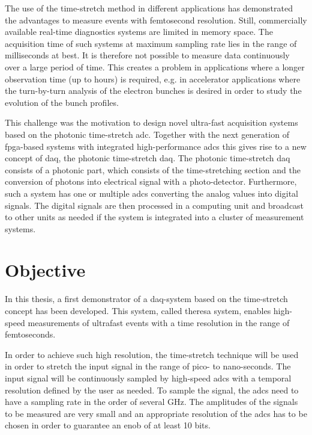 The use of the time-stretch method in different applications has demonstrated the advantages to measure events with femtosecond resolution.
Still, commercially available real-time diagnostics systems are limited in memory space. %
The acquisition time of such systems at maximum sampling rate lies in the range of milliseconds at best.
It is therefore not possible to measure data continuously over a large period of time. 
This creates a problem in applications where a longer observation time (up to hours) is required, e.g. in accelerator applications where the turn-by-turn analysis of the electron bunches is desired in order to study the evolution of the bunch profiles. %

This challenge was the motivation to design novel ultra-fast acquisition systems based on the photonic time-stretch \gls{adc}. 
Together with the next generation of \gls{fpga}-based systems with integrated high-performance \glspl{adc} this gives rise to a new concept of \gls{daq}, the photonic time-stretch \gls{daq}.
The photonic time-stretch \gls{daq} consists of a photonic part, which consists of the time-stretching section and the conversion of photons into electrical signal with a photo-detector. 
Furthermore, such a system has one or multiple \glspl{adc} converting the analog values into digital signals.
The digital signals are then processed in a computing unit and broadcast to other units as needed if the system is integrated into a cluster of measurement systems. %
 

\section{Objective}
In this thesis, a first demonstrator of a \gls{daq}-system based on the time-stretch concept has been developed. %
This system, called \gls{theresa} system, enables high-speed measurements of ultrafast events with a time resolution in the range of femtoseconds.

In order to achieve such high resolution, the time-stretch technique will be used in order to stretch the input signal in the range of pico- to nano-seconds.
The input signal will be continuously sampled by high-speed \glspl{adc} with a temporal resolution defined by the user as needed.
To sample the signal, the \glspl{adc} need to have a sampling rate in the order of several \si{\GHz}.
The amplitudes of the signals to be measured are very small and an appropriate resolution of the \glspl{adc} has to be chosen in order to guarantee an \gls{enob} of at least 10 bits. \cite{bielwaski}

